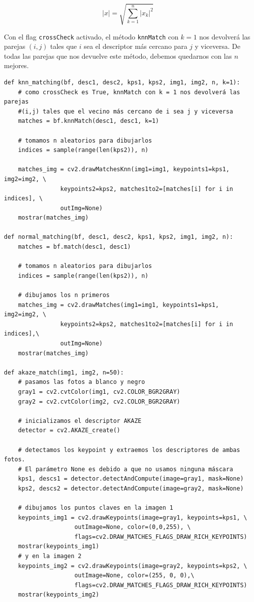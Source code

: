 \documentclass[11pt,a4paper]{article}
\theoremstyle{plain}
\theoremstyle{definition}
\begin{document}
\begin{displaymath}
 |x| = \sqrt{\sum_{k=1}^n |x_k|^2} 
\end{displaymath}

Con el flag \texttt{crossCheck} activado, el método \texttt{knnMatch} con $k=1$ nos devolverá las parejas $(i,j)$ tales que $i$ sea el descriptor más cercano para $j$ y viceversa. De todas las parejas que nos devuelve este método, debemos quedarnos con las $n$ mejores.

\begin{verbatim}
def knn_matching(bf, desc1, desc2, kps1, kps2, img1, img2, n, k=1):
    # como crossCheck es True, knnMatch con k = 1 nos devolverá las parejas 
    #(i,j) tales que el vecino más cercano de i sea j y viceversa
    matches = bf.knnMatch(desc1, desc1, k=1)

    # tomamos n aleatorios para dibujarlos
    indices = sample(range(len(kps2)), n)

    matches_img = cv2.drawMatchesKnn(img1=img1, keypoints1=kps1, img2=img2, \
                keypoints2=kps2, matches1to2=[matches[i] for i in indices], \
                outImg=None)
    mostrar(matches_img)

def normal_matching(bf, desc1, desc2, kps1, kps2, img1, img2, n):
    matches = bf.match(desc1, desc1)

    # tomamos n aleatorios para dibujarlos
    indices = sample(range(len(kps2)), n)

    # dibujamos los n primeros
    matches_img = cv2.drawMatches(img1=img1, keypoints1=kps1, img2=img2, \
                keypoints2=kps2, matches1to2=[matches[i] for i in indices],\
                outImg=None)
    mostrar(matches_img)

def akaze_match(img1, img2, n=50):
    # pasamos las fotos a blanco y negro
    gray1 = cv2.cvtColor(img1, cv2.COLOR_BGR2GRAY)
    gray2 = cv2.cvtColor(img2, cv2.COLOR_BGR2GRAY)

    # inicializamos el descriptor AKAZE
    detector = cv2.AKAZE_create()

    # detectamos los keypoint y extraemos los descriptores de ambas fotos. 
    # El parámetro None es debido a que no usamos ninguna máscara
    kps1, descs1 = detector.detectAndCompute(image=gray1, mask=None)
    kps2, descs2 = detector.detectAndCompute(image=gray2, mask=None)

    # dibujamos los puntos claves en la imagen 1
    keypoints_img1 = cv2.drawKeypoints(image=gray1, keypoints=kps1, \
                    outImage=None, color=(0,0,255), \
                    flags=cv2.DRAW_MATCHES_FLAGS_DRAW_RICH_KEYPOINTS)
    mostrar(keypoints_img1)
    # y en la imagen 2
    keypoints_img2 = cv2.drawKeypoints(image=gray2, keypoints=kps2, \
                    outImage=None, color=(255, 0, 0),\
                    flags=cv2.DRAW_MATCHES_FLAGS_DRAW_RICH_KEYPOINTS)
    mostrar(keypoints_img2)


\end{verbatim}
\end{document}
